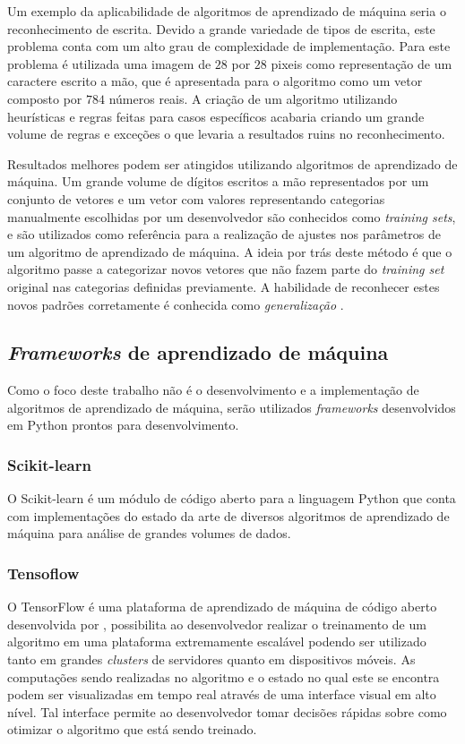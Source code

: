 Um exemplo da aplicabilidade de algoritmos de aprendizado de máquina seria o reconhecimento de escrita. Devido a grande variedade de tipos de escrita, este problema conta com um alto grau de complexidade de implementação. Para este problema é utilizada uma imagem de $28$ por $28$ pixeis como representação de um caractere escrito a mão, que é apresentada para o algoritmo como um vetor composto por $784$ números reais. A criação de um algoritmo utilizando heurísticas e regras feitas para casos específicos acabaria criando um grande volume de regras e exceções o que levaria a resultados ruins no reconhecimento. \cite{bishop:2006}

Resultados melhores podem ser atingidos utilizando algoritmos de aprendizado de máquina. Um grande volume de dígitos escritos a mão representados por um conjunto de vetores e um vetor com valores representando categorias manualmente escolhidas por um desenvolvedor são conhecidos como \textit{training sets}, e são utilizados como referência para a realização de ajustes nos parâmetros de um algoritmo de aprendizado de máquina. A ideia por trás deste método é que o algoritmo passe a categorizar novos vetores que não fazem parte do \textit{training set} original nas categorias definidas previamente. A habilidade de reconhecer estes novos padrões corretamente é conhecida como \textit{generalização} \cite{bishop:2006}.

\subsection{\textit{Frameworks} de aprendizado de máquina}

Como o foco deste trabalho não é o desenvolvimento e a implementação de algoritmos de aprendizado de máquina, serão utilizados \textit{frameworks} desenvolvidos em Python prontos para desenvolvimento. 

\subsubsection{Scikit-learn}

O Scikit-learn é um módulo de código aberto para a linguagem Python que conta com implementações do estado da arte de diversos algoritmos de aprendizado de máquina para análise de grandes volumes de dados. \cite{scikit-learn}  

\subsubsection{Tensoflow}

O TensorFlow é uma plataforma de aprendizado de máquina de código aberto desenvolvida por , possibilita ao desenvolvedor realizar o treinamento de um algoritmo em uma plataforma extremamente escalável podendo ser utilizado tanto em grandes \textit{clusters} de servidores quanto em dispositivos móveis. As computações sendo realizadas no algoritmo e o estado no qual este se encontra podem ser visualizadas em tempo real através de uma interface visual em alto nível. Tal interface permite ao desenvolvedor tomar decisões rápidas sobre como otimizar o algoritmo que está sendo treinado.

